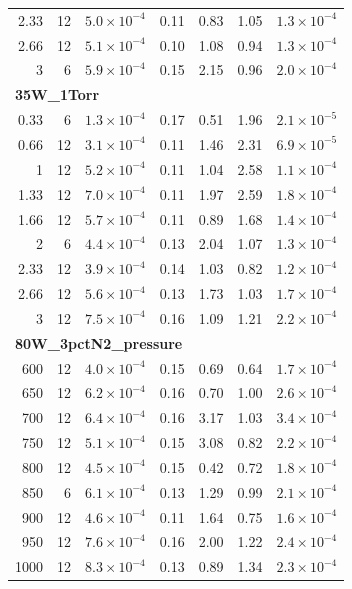 \begin{longtable}{rrrrrrr}
2.33 & 12 & $5.0\times10^{-4}$ & 0.11 & 0.83 & 1.05 & $1.3\times10^{-4}$ \\
2.66 & 12 & $5.1\times10^{-4}$ & 0.10 & 1.08 & 0.94 & $1.3\times10^{-4}$ \\
3 & 6 & $5.9\times10^{-4}$ & 0.15 & 2.15 & 0.96 & $2.0\times10^{-4}$ \\
\midrule\multicolumn{7}{l}{\textbf{35W\_1Torr}}\\
0.33 & 6 & $1.3\times10^{-4}$ & 0.17 & 0.51 & 1.96 & $2.1\times10^{-5}$ \\
0.66 & 12 & $3.1\times10^{-4}$ & 0.11 & 1.46 & 2.31 & $6.9\times10^{-5}$ \\
1 & 12 & $5.2\times10^{-4}$ & 0.11 & 1.04 & 2.58 & $1.1\times10^{-4}$ \\
1.33 & 12 & $7.0\times10^{-4}$ & 0.11 & 1.97 & 2.59 & $1.8\times10^{-4}$ \\
1.66 & 12 & $5.7\times10^{-4}$ & 0.11 & 0.89 & 1.68 & $1.4\times10^{-4}$ \\
2 & 6 & $4.4\times10^{-4}$ & 0.13 & 2.04 & 1.07 & $1.3\times10^{-4}$ \\
2.33 & 12 & $3.9\times10^{-4}$ & 0.14 & 1.03 & 0.82 & $1.2\times10^{-4}$ \\
2.66 & 12 & $5.6\times10^{-4}$ & 0.13 & 1.73 & 1.03 & $1.7\times10^{-4}$ \\
3 & 12 & $7.5\times10^{-4}$ & 0.16 & 1.09 & 1.21 & $2.2\times10^{-4}$ \\
\midrule\multicolumn{7}{l}{\textbf{80W\_3pctN2\_pressure}}\\
600 & 12 & $4.0\times10^{-4}$ & 0.15 & 0.69 & 0.64 & $1.7\times10^{-4}$ \\
650 & 12 & $6.2\times10^{-4}$ & 0.16 & 0.70 & 1.00 & $2.6\times10^{-4}$ \\
700 & 12 & $6.4\times10^{-4}$ & 0.16 & 3.17 & 1.03 & $3.4\times10^{-4}$ \\
750 & 12 & $5.1\times10^{-4}$ & 0.15 & 3.08 & 0.82 & $2.2\times10^{-4}$ \\
800 & 12 & $4.5\times10^{-4}$ & 0.15 & 0.42 & 0.72 & $1.8\times10^{-4}$ \\
850 & 6 & $6.1\times10^{-4}$ & 0.13 & 1.29 & 0.99 & $2.1\times10^{-4}$ \\
900 & 12 & $4.6\times10^{-4}$ & 0.11 & 1.64 & 0.75 & $1.6\times10^{-4}$ \\
950 & 12 & $7.6\times10^{-4}$ & 0.16 & 2.00 & 1.22 & $2.4\times10^{-4}$ \\
1000 & 12 & $8.3\times10^{-4}$ & 0.13 & 0.89 & 1.34 & $2.3\times10^{-4}$ \\

\end{longtable}
